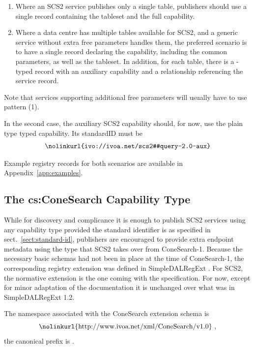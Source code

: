 \documentclass[11pt,a4paper]{ivoa}
\begin{document}
\begin{enumerate}
\item Where an SCS2 service publishes only a single table, publishers
should use a single  record containing the
tableset and the full capability.

\item Where a data centre has multiple tables available for SCS2, and a
generic service without extra free parameters handles them, the
preferred scenario is to have a single  record
declaring the capability, including the common parameters, as well as
the tableset.  In addition, for each table, there is a
-typed record with an auxiliary capability and
a relationship referencing the service record.

\end{enumerate}

Note that services supporting additional free parameters will usually
have to use pattern (1).

In the second case, the auxiliary SCS2 capability should, for now, use
the plain type  typed capability.  Its standardID
must be
$$
\hbox{\nolinkurl{ivo://ivoa.net/scs2#query-2.0-aux}}
$$

Example registry records for both scenarios are available in
Appendix~\ref{app:examples}.


\subsection{The cs:ConeSearch Capability Type}

While for discovery and complicance it is enough to publish SCS2
services using any capability type provided the standard identifier is
as specified in sect.~\ref{sect:standard-id}, publishers are encouraged
to provide extra endpoint metadata using the  type
that SCS2 takes over from ConeSearch-1.  Because the necessary
basic schemas had not been in place at the time of ConeSearch-1, the
corresponding registry extension was defined in SimpleDALRegExt
\citep{2022ivoa.spec.0222D}.  For SCS2, the normative extension is the
one coming with the specification.  For now, except for minor adaptation
of the documentation it is unchanged over what
was in SimpleDALRegExt 1.2.

The namespace associated with the ConeSearch extension schema is
$$\hbox{\nolinkurl{http://www.ivoa.net/xml/ConeSearch/v1.0} ,}$$
the canonical prefix is .
\end{document}
